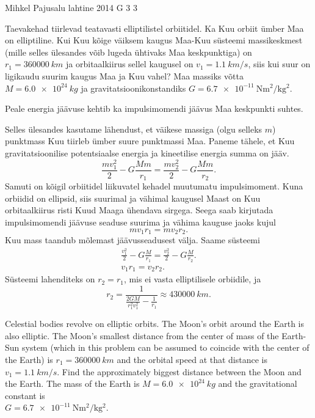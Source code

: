 {Mihkel Pajusalu} %
{lahtine} %
{2014} %
{G 3} %
{3} %
{
\ifStatement
Taevakehad tiirlevad teatavasti elliptilistel orbiitidel. Ka Kuu orbiit ümber Maa on elliptiline. Kui Kuu kõige väiksem kaugus Maa-Kuu süsteemi massikeskmest (mille selles ülesandes võib lugeda ühtivaks Maa keskpunktiga) on $r_{1}=\SI{360000}{km}$ ja orbitaalkiirus sellel kaugusel on $v_1=\SI{1.1}{km/s}$, siis kui suur on ligikaudu suurim kaugus Maa ja Kuu vahel? Maa massiks võtta $M=\SI{6.0e24}{kg}$ ja gravitatsioonikonstandiks $G=\SI{6.7e-11}{\newton\metre\squared\per\kilo\gram\squared}$.
\fi


\ifHint
Peale energia jäävuse kehtib ka impulsimomendi jäävus Maa keskpunkti suhtes.
\fi


\ifSolution
Selles ülesandes kasutame lähendust, et väikese massiga (olgu selleks $m$) punktmass Kuu tiirleb ümber suure punktmassi Maa. Paneme tähele, et Kuu gravitatsioonilise potentsiaalse energia ja kineetilise energia summa on jääv.
$$
\frac{mv_1^2}{2}-G\frac{Mm}{r_1}=\frac{mv_2^2}{2}-G\frac{Mm}{r_2}.
$$
Samuti on kõigil orbiitidel liikuvatel kehadel muutumatu impulsimoment. Kuna orbiidid on ellipsid, siis suurimal ja vähimal kaugusel Maast on Kuu orbitaalkiirus risti Kuud Maaga ühendava sirgega. Seega saab kirjutada impulsimomendi jäävuse seaduse suurima ja vähima kauguse jaoks kujul
$$
mv_1r_1=mv_2r_2.
$$
Kuu mass taandub mõlemast jäävusseadusest välja. Saame süsteemi
$$
\begin{array}{c} 
\frac{v_1^2}{2}-G\frac{M}{r_1}=\frac{v_2^2}{2}-G\frac{M}{r_2}.\\
v_1r_1=v_2r_2.
\end{array}
$$
Süsteemi lahenditeks on $r_2=r_1$, mis ei vasta elliptilisele orbiidile, ja $$r_2=\frac{1}{\frac{2GM}{r_1^2v_1^2}-\frac{1}{r_1}}\approx\SI{430000}{km}.$$
\fi


\ifEngStatement
Celestial bodies revolve on elliptic orbits. The Moon’s orbit around the Earth is also elliptic. The Moon’s smallest distance from the center of mass of the Earth-Sun system (which in this problem can be assumed to coincide with the center of the Earth) is $r_{1}=\SI{360000}{km}$ and the orbital speed at that distance is $v_1=\SI{1.1}{km/s}$. Find the approximately biggest distance between the Moon and the Earth. The mass of the Earth is $M=\SI{6.0e24}{kg}$ and the gravitational constant is\\ $G=\SI{6.7e-11}{\newton\metre\squared\per\kilo\gram\squared}$.
\fi


}
